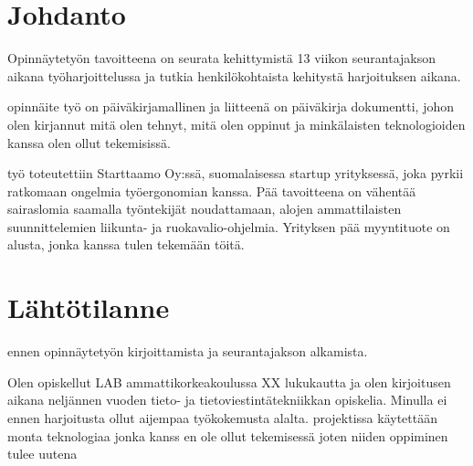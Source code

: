 \documentclass[11pt,a4paper,titlepage,oneside]{article}
\begin{document}
\pagestyle{fancy}
\lfoot{}
\cfoot{}
\rfoot{}
\lhead{}
\chead{}
\rhead{\thepage}
\renewcommand{\headrulewidth}{0pt}
\renewcommand{\footrulewidth}{0pt}


\section{Johdanto}              %



Opinnäytetyön tavoitteena on seurata kehittymistä 13 viikon seurantajakson aikana työharjoittelussa 
ja tutkia henkilökohtaista kehitystä harjoituksen aikana.
\medskip


opinnäite työ on päiväkirjamallinen ja liitteenä on päiväkirja dokumentti, 
johon olen kirjannut mitä olen tehnyt, mitä olen oppinut ja minkälaisten teknologioiden kanssa olen ollut tekemisissä.
\medskip


työ toteutettiin Starttaamo Oy:ssä, suomalaisessa startup yrityksessä, joka pyrkii ratkomaan ongelmia työergonomian kanssa.
Pää tavoitteena on vähentää sairaslomia saamalla työntekijät noudattamaan, alojen ammattilaisten suunnittelemien liikunta- ja ruokavalio-ohjelmia. 
Yrityksen pää myyntituote on alusta, jonka kanssa tulen tekemään töitä.


\medskip






\newpage
\section{Lähtötilanne}         %


ennen opinnäytetyön kirjoittamista ja seurantajakson alkamista. 

Olen opiskellut LAB ammattikorkeakoulussa XX lukukautta ja olen kirjoitusen aikana neljännen vuoden tieto- ja tietoviestintätekniikkan opiskelia.
%
Minulla ei ennen harjoitusta ollut aijempaa työkokemusta alalta. 
projektissa käytettään monta teknologiaa jonka kanss en ole ollut tekemisessä joten niiden oppiminen tulee uutena
\medskip
\end{document}
